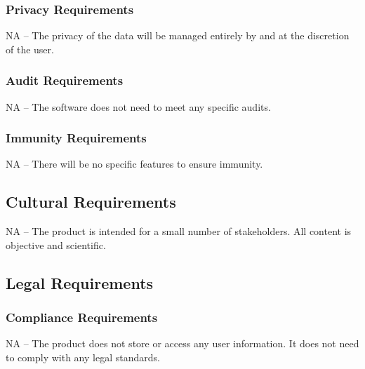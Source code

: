 \documentclass[12pt]{article}
\newcounter{ReqNumCounter}
\newcommand{\requirement}[8]{%
\fbox{\parbox{\textwidth}{%
\parbox[t]{.333\textwidth}{\raggedright%
\textbf{Req. \#}: \refstepcounter{ReqNumCounter} \arabic{ReqNumCounter} \label{#1}}%
\parbox[t]{.333\textwidth}{\centering%
\textbf{Req. Type}: \ref{#2}}%
\parbox[t]{.333\textwidth}{\raggedleft%
\textbf{Use Case \#}: \ref{#3}}
\newline\\
\textbf{Description}: #4\\\\
\textbf{Rationale}: #5\\\\
\textbf{Fit Criterion}: #6\\\\
\textbf{Priority}: #7 \hfill \textbf{History}: #8
}}}
\begin{document}
\subsubsection{Privacy Requirements}
NA -- The privacy of the data will be managed entirely by and at the discretion of the user.

\subsubsection{Audit Requirements}
NA -- The software does not need to meet any specific audits.

\subsubsection{Immunity Requirements}
NA -- There will be no specific features to ensure immunity.

\subsection{Cultural Requirements} %
NA -- The product is intended for a small number of stakeholders. All content is objective and scientific.

\subsection{Legal Requirements} %
\subsubsection{Compliance Requirements}
NA -- The product does not store or access any user information. It does not need to comply with any legal standards.
\end{document}
